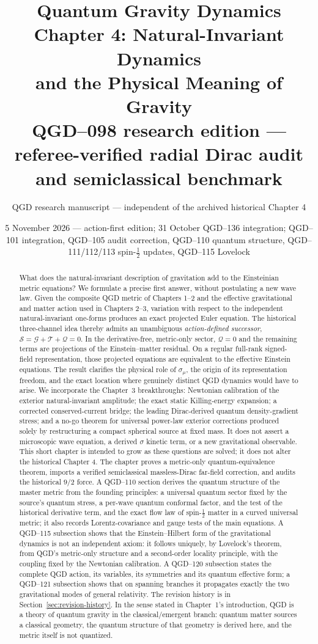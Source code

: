 \documentclass[11pt,a4paper]{article}
\title{\textbf{Quantum Gravity Dynamics}\\[6pt]
\large Chapter 4: Natural-Invariant Dynamics\\ and the Physical Meaning of Gravity\\[5pt]
\normalsize QGD--098 research edition --- referee-verified radial Dirac audit and semiclassical benchmark}
\author{QGD research manuscript --- independent of the archived historical Chapter 4}
\date{5 November 2026 --- action-first edition; 31 October QGD--136 integration; QGD--101 integration, QGD--105 audit correction, QGD--110 quantum structure, QGD--111/112/113 spin-$\frac12$ updates, QGD--115 Lovelock}
\newcommand{\cG}{\mathscr G}
\newcommand{\cT}{\mathscr T}
\newcommand{\cQ}{\mathscr Q}
\newcommand{\cS}{\mathscr S}
\begin{document}
\maketitle
\begin{abstract}
What does the natural-invariant description of gravitation add to the
Einsteinian metric equations? We formulate a precise first answer, without
postulating a new wave law. Given the composite QGD metric of Chapters 1--2
and the effective gravitational and matter action used in Chapters 2--3,
variation with respect to the independent natural-invariant one-forms
produces an exact projected Euler equation. The historical three-channel
idea thereby admits an unambiguous \emph{action-defined successor},
$\cS=\cG+\cT+\cQ=0$. In the derivative-free, metric-only sector,
$\cQ=0$ and the remaining terms are projections of the Einstein--matter
residual. On a regular full-rank signed-field representation, those
projected equations are equivalent to the effective Einstein equations.
The result clarifies the physical role of $\sigma_\mu$, the origin of its
representation freedom, and the exact location where genuinely distinct
QGD dynamics would have to arise. We incorporate the Chapter~3 breakthroughs:
Newtonian calibration of the exterior natural-invariant amplitude; the
exact static Killing-energy expansion; a corrected conserved-current
bridge; the leading Dirac-derived quantum density-gradient stress; and a
no-go theorem for universal power-law exterior corrections produced solely
by restructuring a compact spherical source at fixed mass. It does not assert a microscopic
wave equation, a derived $\sigma$ kinetic term, or a new gravitational
observable. This short chapter is intended to grow as these questions
are solved; it does not alter the historical Chapter 4. The chapter proves a metric-only quantum-equivalence theorem, imports a
verified semiclassical massless-Dirac far-field correction, and audits the
historical $9/2$ force. A QGD--110 section derives the quantum structure of the
master metric from the founding principles: a universal quantum sector fixed by the
source's quantum stress, a per-wave quantum conformal factor, and the test of the
historical derivative term, and the exact flow law of spin-$\frac12$ matter in a curved
universal metric; it also records Lorentz-covariance and gauge tests of the main
equations. A QGD--115 subsection shows that the Einstein--Hilbert form of the
gravitational dynamics is not an independent axiom: it follows uniquely, by
Lovelock's theorem, from QGD's metric-only structure and a second-order locality
principle, with the coupling fixed by the Newtonian calibration. A QGD--120 subsection
states the complete QGD action, its variables, its symmetries and its quantum effective
form; a QGD--121 subsection shows that on spanning branches it propagates exactly the two
gravitational modes of general relativity. The revision history is in
Section~\ref{sec:revision-history}.
In the sense stated in Chapter~1's introduction, QGD is a theory of quantum gravity in the
classical/emergent branch: quantum matter sources a classical geometry, the quantum structure of
that geometry is derived here, and the metric itself is not quantized.
\end{abstract}
\end{document}
